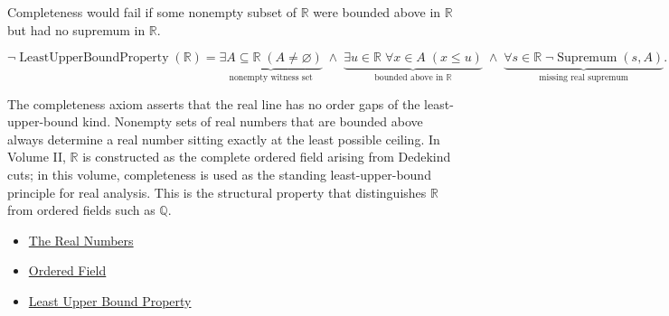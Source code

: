 \begin{remark*}
Completeness would fail if some nonempty subset of $\mathbb{R}$ were bounded above in $\mathbb{R}$ but had no supremum in $\mathbb{R}$.
\end{remark*}

\begin{remark*}
\[
\neg\operatorname{LeastUpperBoundProperty}(\mathbb{R})
=
\underbrace{\exists A\subseteq\mathbb{R}\;(A\neq\varnothing)}_{\text{nonempty witness set}}
\;\land\;
\underbrace{\exists u\in\mathbb{R}\;\forall x\in A\;(x\le u)}_{\text{bounded above in }\mathbb{R}}
\;\land\;
\underbrace{\forall s\in\mathbb{R}\;\neg\operatorname{Supremum}(s,A)}_{\text{missing real supremum}}.
\]
\end{remark*}

\begin{remark*}[Interpretation]
The completeness axiom asserts that the real line has no order gaps of the least-upper-bound kind. Nonempty sets of real numbers that are bounded above always determine a real number sitting exactly at the least possible ceiling. In Volume II, $\mathbb{R}$ is constructed as the complete ordered field arising from Dedekind cuts; in this volume, completeness is used as the standing least-upper-bound principle for real analysis. This is the structural property that distinguishes $\mathbb{R}$ from ordered fields such as $\mathbb{Q}$.
\end{remark*}

\begin{dependencies}
\begin{itemize}
  \item \hyperref[def:reals]{The Real Numbers}
  \item \hyperref[def:abstract-ordered-field]{Ordered Field}
  \item \hyperref[def:least-upper-bound-property]{Least Upper Bound Property}
\end{itemize}
\end{dependencies}
